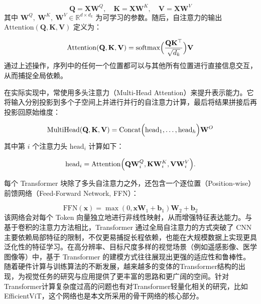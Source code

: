 \begin{equation}
	\mathbf{Q} = \mathbf{X} \mathbf{W}^Q,\quad
	\mathbf{K} = \mathbf{X} \mathbf{W}^K,\quad
	\mathbf{V} = \mathbf{X} \mathbf{W}^V
\end{equation}
其中 $\mathbf{W}^Q,\ \mathbf{W}^K,\ \mathbf{W}^V\in \mathbb{R}^{d \times d_k}$ 为可学习的参数。随后，自注意力的输出 $\mathrm{Attention}(\mathbf{Q}, \mathbf{K}, \mathbf{V})$ 定义为：

\begin{equation}
	\mathrm{Attention}(\mathbf{Q}, \mathbf{K}, \mathbf{V})
	= \mathrm{softmax}\Bigl(\frac{\mathbf{Q}\mathbf{K}^\top}{\sqrt{d_k}}\Bigr)\mathbf{V}
\end{equation}
通过上述操作，序列中的任何一个位置都可以与其他所有位置进行直接信息交互，从而捕捉全局依赖。


在实际实现中，常使用多头注意力（Multi-Head Attention）来提升表示能力。它将输入分别投影到多个子空间上并进行并行的自注意力计算，最后将结果拼接后再投影回原始维度：

\begin{equation}
	\mathrm{MultiHead}(\mathbf{Q}, \mathbf{K}, \mathbf{V})
	= \mathrm{Concat}\Bigl(\mathrm{head}_1, \ldots, \mathrm{head}_h\Bigr)\mathbf{W}^O
\end{equation}
其中第 $i$ 个注意力头 $\mathrm{head}_i$ 计算如下：

\begin{equation}
	\mathrm{head}_i
	= \mathrm{Attention}\Bigl(\mathbf{Q}\mathbf{W}^Q_i,
	\mathbf{K}\mathbf{W}^K_i,
	\mathbf{V}\mathbf{W}^V_i\Bigr).
\end{equation}


每个 Transformer 块除了多头自注意力之外，还包含一个逐位置（Position-wise）前馈网络（Feed-Forward Network, FFN）：

\begin{equation}
	\mathrm{FFN}(\mathbf{x}) = \max(0, \mathbf{x}\mathbf{W}_1 + \mathbf{b}_1)\mathbf{W}_2 + \mathbf{b}_2
\end{equation}
该网络会对每个 Token 向量独立地进行非线性映射，从而增强特征表达能力。与基于卷积的注意力方法相比，Transformer 通过全局自注意力的方式突破了 CNN 主要依赖局部特征的限制，不仅更易捕捉长程依赖，也能在大规模数据上实现更具泛化性的特征学习。在高分辨率、目标尺度多样的视觉场景（例如遥感影像、医学图像等）中，基于 Transformer 的建模方式往往展现出更强的适应性和鲁棒性。随着硬件计算与训练算法的不断发展，越来越多的变体的Transformer结构的出现\cite{sun2023mobilevit,Zhang_2023_CVPR,Chen2024addvit}，为视觉任务的研究与应用提供了更丰富的思路和更广阔的空间。针对Transformer计算复杂度过高的问题也有对Transformer轻量化相关的研究，比如EfficientViT\cite{liu2023efficientvit}，这个网络也是本文所采用的骨干网络的核心部分。

